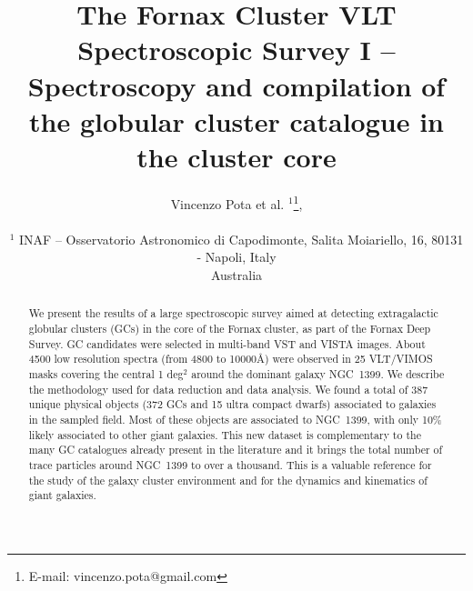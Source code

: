 \usepackage{times}
\usepackage{graphicx}
\usepackage{amsmath}
\usepackage{amssymb}
\usepackage{color}
\usepackage{journal_names}
\usepackage{paralist}
\usepackage[inline]{enumitem}

\newcommand{\kms}{\mbox{\,km~s$^{-1}$}}
\setlength{\tabcolsep}{0.06in}   %
 
\title[The Fornax Cluster VLT Spectroscopic Survey]{The Fornax Cluster VLT 
Spectroscopic Survey I -- Spectroscopy and compilation of the globular cluster 
catalogue in the cluster core}

\author[Pota et al.]{\noindent
Vincenzo Pota et al. $^{1}$\thanks{E-mail: vincenzo.pota@gmail.com}, 
\\~\\
$^1$ INAF -- Osservatorio Astronomico di Capodimonte, Salita Moiariello, 16, 
80131 - Napoli, Italy\\
Australia\\
}

\voffset=-0.6in


\label{firstpage}

\maketitle
\begin{abstract}
We present the results of a large spectroscopic survey aimed at detecting 
extragalactic globular clusters (GCs) in the core of the Fornax cluster, as 
part of the Fornax Deep Survey. GC candidates were selected in multi-band VST 
and VISTA images. About 4500 low resolution spectra (from 4800 to 10000\AA) 
were observed in 25 VLT/VIMOS masks covering the central 1 deg$^2$ around the 
dominant galaxy NGC~1399. We describe the methodology used for data reduction 
and data analysis. We found a total of 387 unique physical objects (372 GCs and 
15 ultra compact dwarfs) associated to galaxies in the sampled field. Most of 
these objects are associated to NGC~1399, with only 10\% likely associated to 
other giant galaxies. This new dataset is complementary to the many GC 
catalogues already present in the literature and it brings the total number of 
trace particles around  NGC~1399 to over a thousand. This is a valuable 
reference for the study of the galaxy cluster environment and for the dynamics 
and kinematics of giant galaxies. 

\end{abstract}

